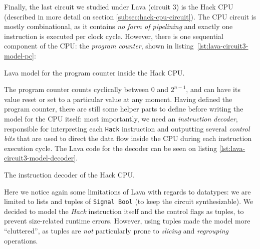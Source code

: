             Finally, the last circuit we studied under Lava (circuit 3) is the Hack CPU (described
            in more detail on section \ref{subsec:hack-cpu-circuit}). The CPU circuit is mostly
            combinational, as it contains \emph{no form of pipelining} and exactly one instruction
            is executed per clock cycle. However, there is one sequential component of the CPU: the
            \emph{program counter}, shown in listing~\ref{lst:lava-circuit3-model-pc}:

            \begin{listing}[h!]
                \caption{Lava model for the program counter inside the Hack CPU.
                    \label{lst:lava-circuit3-model-pc}}
            \end{listing}

            The program counter counts cyclically between $ 0 $ and $ 2^{n-1} $, and can have its
            value reset or set to a particular value at any moment. Having defined the program
            counter, there are still some helper parts to define before writing the model for the
            CPU itself: most importantly, we need an \emph{instruction decoder}, responsible for
            interpreting each \texttt{Hack} instruction and outputting several \emph{control bits}
            that are used to direct the data flow inside the CPU during each instruction execution
            cycle. The Lava code for the decoder can be seen on listing
            \ref{lst:lava-circuit3-model-decoder}.

            \begin{listing}[h!]
                \caption{The instruction decoder of the Hack CPU.
                    \label{lst:lava-circuit3-model-decoder}}
            \end{listing}

            Here we notice again some limitations of Lava with regards to datatypes: we are limited
            to lists and tuples of \texttt{Signal Bool} (to keep the circuit synthesizable). We
            decided to model the \emph{Hack} instruction itself and the control flags as tuples, to
            prevent size-related runtime errors. However, using tuples made the model more
            ``cluttered'', as tuples are \emph{not} particularly prone to \emph{slicing} and
            \emph{regrouping} operations.

